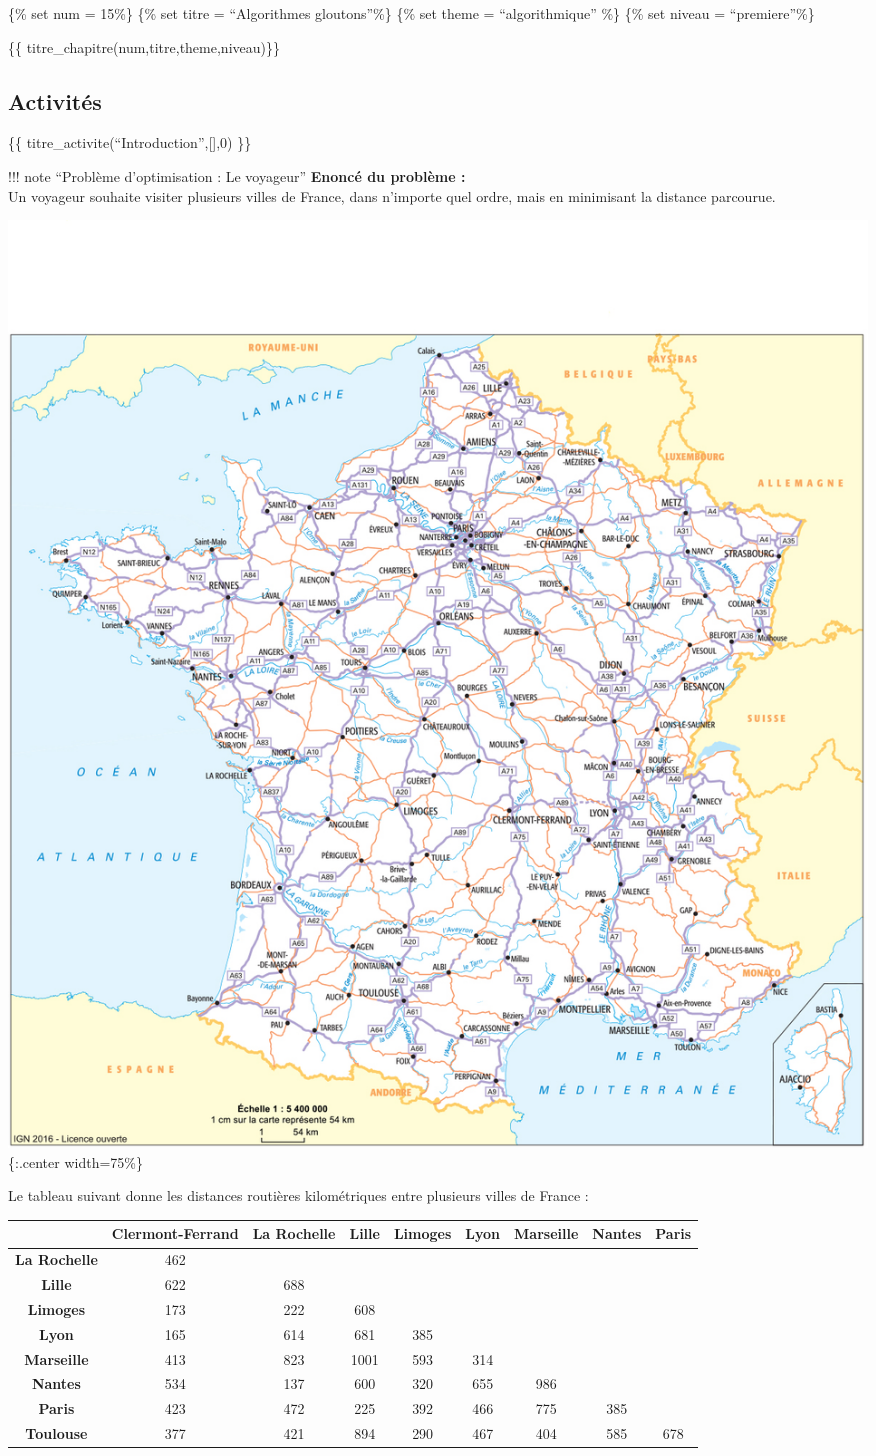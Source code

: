 \{\% set num = 15\%\} \{\% set titre = ``Algorithmes gloutons''\%\} \{\%
set theme = ``algorithmique'' \%\} \{\% set niveau = ``premiere''\%\}

\{\{ titre\_chapitre(num,titre,theme,niveau)\}\}

\hypertarget{activituxe9s}{%
\subsection{Activités}\label{activituxe9s}}

\{\{ titre\_activite(``Introduction'',{[}{]},0) \}\}

!!! note ``Problème d'optimisation : Le voyageur'' \textbf{Enoncé du
problème :}\\
Un voyageur souhaite visiter plusieurs villes de France, dans n'importe
quel ordre, mais en minimisant la distance parcourue.

\includegraphics{data/carte_route.jpg}\{:.center width=75\%\}

Le tableau suivant donne les distances routières kilométriques entre
plusieurs villes de France :

\begin{longtable}[]{@{}ccccccccc@{}}
\toprule
& \textbf{Clermont-Ferrand} & \textbf{La Rochelle} & \textbf{Lille} &
\textbf{Limoges} & \textbf{Lyon} & \textbf{Marseille} & \textbf{Nantes}
& \textbf{Paris}\tabularnewline
\midrule
\endhead
\textbf{La Rochelle} & 462 & & & & & & &\tabularnewline
\textbf{Lille} & 622 & 688 & & & & & &\tabularnewline
\textbf{Limoges} & 173 & 222 & 608 & & & & &\tabularnewline
\textbf{Lyon} & 165 & 614 & 681 & 385 & & & &\tabularnewline
\textbf{Marseille} & 413 & 823 & 1001 & 593 & 314 & & &\tabularnewline
\textbf{Nantes} & 534 & 137 & 600 & 320 & 655 & 986 & &\tabularnewline
\textbf{Paris} & 423 & 472 & 225 & 392 & 466 & 775 & 385
&\tabularnewline
\textbf{Toulouse} & 377 & 421 & 894 & 290 & 467 & 404 & 585 &
678\tabularnewline
\bottomrule
\end{longtable}

